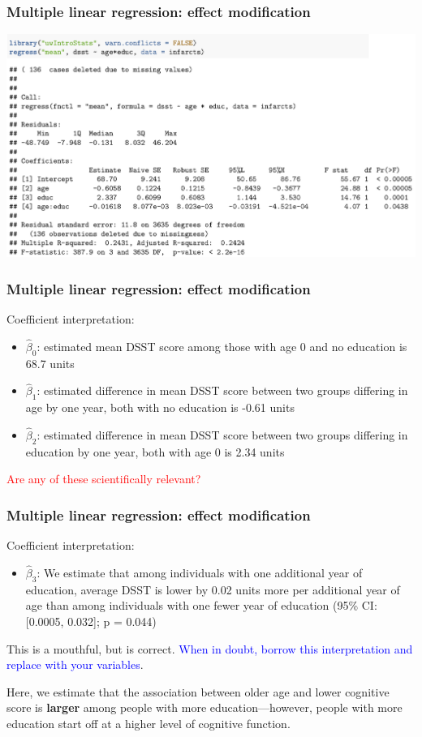 \documentclass[12pt, 
hyperref={colorlinks=true, linkcolor=blue, urlcolor=cyan},dvipsnames]{beamer}
\begin{document}
\begin{frame}
\frametitle{Multiple linear regression: effect modification}

\vspace{-1cm}\hspace*{-0.5cm}
\includegraphics[width=1.1\textwidth]{plots/dsst_age_educ_em.png}

\end{frame}

\begin{frame}
\frametitle{Multiple linear regression: effect modification}
Coefficient interpretation:
\begin{itemize}
\item $\hat{\beta}_0$: estimated mean DSST score among those with age 0 and no education is 68.7 units
\item $\hat{\beta}_1$: estimated difference in mean DSST score between two groups differing in age by one year, both with no education is -0.61 units
\item $\hat{\beta}_2$: estimated difference in mean DSST score between two groups differing in education by one year, both with age 0 is 2.34 units
\end{itemize}

\textcolor{red}{Are any of these scientifically relevant?}
\end{frame}

\begin{frame}
\frametitle{Multiple linear regression: effect modification}
Coefficient interpretation:
\begin{itemize}
\item $\hat{\beta}_3$: We estimate that among individuals with one additional year of education, average DSST is lower by 0.02 units more per additional year of age than among individuals with one fewer year of education (95\% CI: [0.0005, 0.032]; p = 0.044)
\end{itemize}

This is a mouthful, but is correct. \textcolor{blue}{When in doubt, borrow this interpretation and replace with your variables}.

Here, we estimate that the association between older age and lower cognitive score is \textbf{larger} among people with more education---however, people with more education start off at a higher level of cognitive function. 
\end{frame}
\end{document}
